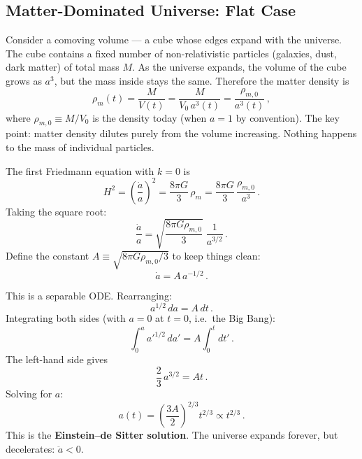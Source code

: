 \subsection{Matter-Dominated Universe: Flat Case}

Consider a comoving volume --- a cube whose edges expand with the universe. The cube contains a fixed number of non-relativistic particles (galaxies, dust, dark matter) of total mass $M$. As the universe expands, the volume of the cube grows as $a^3$, but the mass inside stays the same. Therefore the matter density is
\begin{equation}
    \rho_m(t) = \frac{M}{V(t)} = \frac{M}{V_0\,a^3(t)} = \frac{\rho_{m,0}}{a^3(t)}\,,
\end{equation}
where $\rho_{m,0}\equiv M/V_0$ is the density today (when $a=1$ by convention). The key point: matter density dilutes purely from the volume increasing. Nothing happens to the mass of individual particles.

The first Friedmann equation with $k=0$ is
\begin{equation}\label{eq:fried_flat_matter}
    H^2 = \left(\frac{\dot{a}}{a}\right)^2 = \frac{8\pi G}{3}\,\rho_m = \frac{8\pi G}{3}\,\frac{\rho_{m,0}}{a^3}\,.
\end{equation}
Taking the square root:
\begin{equation}
    \frac{\dot{a}}{a} = \sqrt{\frac{8\pi G\rho_{m,0}}{3}}\;\frac{1}{a^{3/2}}\,.
\end{equation}
Define the constant $A\equiv\sqrt{8\pi G\rho_{m,0}/3}$ to keep things clean:
\begin{equation}\label{eq:matter_ode}
    \dot{a} = A\,a^{-1/2}\,.
\end{equation}

This is a separable ODE. Rearranging:
\begin{equation}
    a^{1/2}\,da = A\,dt\,.
\end{equation}
Integrating both sides (with $a=0$ at $t=0$, i.e.\ the Big Bang):
\begin{equation}
    \int_0^a a'^{1/2}\,da' = A\int_0^t dt'\,.
\end{equation}
The left-hand side gives
\begin{equation}
    \frac{2}{3}\,a^{3/2} = At\,.
\end{equation}
Solving for $a$:
\begin{equation}
\boxed{a(t) = \left(\frac{3A}{2}\right)^{2/3}t^{2/3} \propto t^{2/3}\,.}
\end{equation}
This is the \textbf{Einstein--de Sitter solution}. The universe expands forever, but decelerates: $\ddot{a}<0$.

